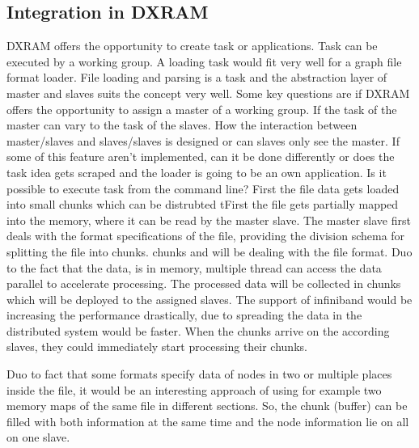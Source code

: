 \subsection{Integration in DXRAM}
DXRAM offers the opportunity to create task or applications. Task can be executed by a working group. A loading task would fit very well for a graph file format loader. File loading and parsing is a task and the abstraction layer of master and slaves suits the concept very well.
Some key questions are if DXRAM offers the opportunity to assign a master of a working group. If the task of the master can vary to the task of the slaves. How the interaction between master/slaves and slaves/slaves is designed or can slaves only see the master.
If some of this feature aren’t implemented, can it be done differently or does the task idea gets scraped and the loader is going to be an own application. Is it possible to execute task from the command line?
First the file data gets loaded into small chunks which can be distrubted tFirst the file gets partially mapped into the memory, where it can be read by the master slave. The master slave first deals with the format specifications of the file, providing the division schema for splitting the file into chunks. chunks and will be dealing with the file format. Duo to the fact that the data, is in memory, multiple thread can access the data parallel to accelerate processing. The processed data will be collected in chunks which will be deployed to the assigned slaves.
The support of infiniband would be increasing the performance drastically, due to spreading the data in the distributed system would be faster.
When the chunks arrive on the according slaves, they could immediately start processing their chunks.
 
Duo to fact that some formats specify data of nodes in two or multiple places inside the file, it would be an interesting approach of using for example two memory maps of the same file in different sections. So, the chunk (buffer) can be filled with both information at the same time and the node information lie on all on one slave.


